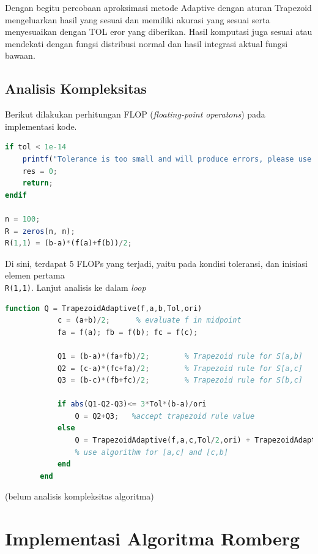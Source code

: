 \documentclass[journal,12pt,onecolumn,a4paper]{IEEEtran}
\begin{document}
Dengan begitu percobaan aproksimasi metode Adaptive dengan aturan Trapezoid mengeluarkan hasil yang sesuai dan memiliki akurasi yang sesuai serta menyesuaikan dengan TOL eror yang diberikan. Hasil komputasi juga sesuai atau mendekati dengan fungsi distribusi normal dan hasil integrasi aktual fungsi bawaan.

\subsection{Analisis Kompleksitas}
Berikut dilakukan perhitungan FLOP (\emph{floating-point operatons}) pada implementasi kode.

\begin{center}
	\begin{lstlisting}[language=Octave]
if tol < 1e-14
	printf("Tolerance is too small and will produce errors, please use larger values\n")
	res = 0;
	return;
endif

n = 100;
R = zeros(n, n);
R(1,1) = (b-a)*(f(a)+f(b))/2;
	\end{lstlisting}
\end{center}

Di sini, terdapat 5 FLOPs yang terjadi, yaitu pada kondisi toleransi, dan inisiasi elemen pertama \\ \lstinline{R(1,1)}. Lanjut analisis ke dalam \emph{loop}
\begin{center}
	\begin{lstlisting}[language=Octave]
		function Q = TrapezoidAdaptive(f,a,b,Tol,ori)
			c = (a+b)/2;      % evaluate f in midpoint
			fa = f(a); fb = f(b); fc = f(c);

			Q1 = (b-a)*(fa+fb)/2;        % Trapezoid rule for S[a,b]
			Q2 = (c-a)*(fc+fa)/2;        % Trapezoid rule for S[a,c]
			Q3 = (b-c)*(fb+fc)/2;        % Trapezoid rule for S[b,c]

			if abs(Q1-Q2-Q3)<= 3*Tol*(b-a)/ori
				Q = Q2+Q3;   %accept trapezoid rule value
			else
				Q = TrapezoidAdaptive(f,a,c,Tol/2,ori) + TrapezoidAdaptive(f,c,b,Tol/2,ori);
				% use algorithm for [a,c] and [c,b]
			end
		end
	\end{lstlisting}
\end{center}

(belum analisis kompleksitas algoritma)

\section{Implementasi Algoritma Romberg}
\end{document}
